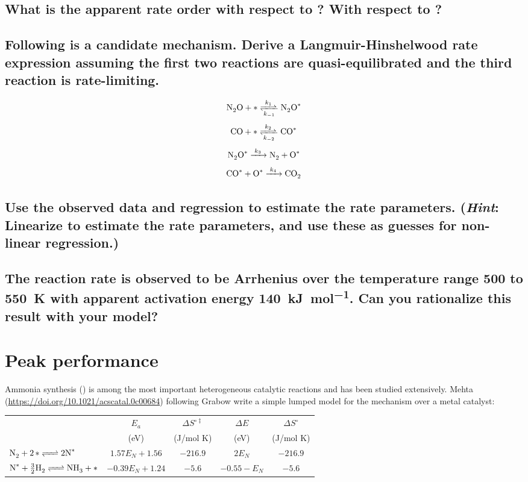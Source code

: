 \documentclass[11pt]{article}
\begin{document}
\subsection{What is the apparent rate order with respect to ? With respect to ?}
\label{sec:org3eb3206}

\subsection{Following is a candidate mechanism. Derive a Langmuir-Hinshelwood rate expression assuming the first two reactions are quasi-equilibrated and the third reaction is rate-limiting.}
\label{sec:org6390e40}

\[ \ce{N2O + \ast{} <=>[k_1][k_{-1}] N2O^\ast} \]
\[ \ce{CO + \ast{} <=>[k_2][k_{-2}] CO^\ast} \]
\[ \ce{N2O^\ast{} ->[k_3] N2 + O^\ast} \]
\[ \ce{CO^\ast{} + O^\ast{} ->[k_4] CO2 } \]

\subsection{Use the observed data and regression to estimate the rate parameters. (\emph{Hint}: Linearize to estimate the rate parameters, and use these as guesses for non-linear regression.)}
\label{sec:org908bd96}

\subsection{The reaction rate is observed to be Arrhenius over the temperature range 500 to \SI{550}{K} with apparent activation energy \SI{140}{\kilo\joule\per\mole}. Can you rationalize this result with your model?}
\label{sec:org34b1949}

\section{Peak performance}
\label{sec:orgfcd5369}
Ammonia synthesis () is among the most important heterogeneous catalytic reactions and has been studied extensively. Mehta (\url{https://doi.org/10.1021/acscatal.0c00684}) following Grabow write a simple lumped model for the mechanism over a metal catalyst:

\begin{center}
\begin{tabular}{lcccc}
\hline
 & \(E_a\) & \(\Delta S^{\circ\ddagger}\) & \(\Delta E\) & \(\Delta S^\circ\)\\
 & (eV) & (J/mol K) & (eV) & (J/mol K)\\
\hline
\(\ce{N2 + 2\ast{} <=> 2 N^\ast{} }\) & \(1.57 E_N + 1.56\) & \(-216.9\) & \(2 E_N\) & \(-216.9\)\\
\(\ce{N^\ast{} + 3/2 H2 <=> NH3 + \ast{}}\) & \(-0.39 E_N + 1.24\) & \(-5.6\) & \(-0.55-E_N\) & \(-5.6\)\\
\hline
\end{tabular}
\end{center}
\end{document}

